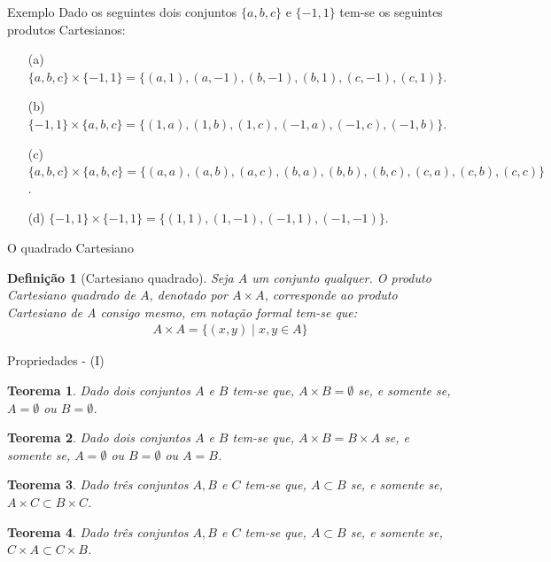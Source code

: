 \documentclass[aspectratio=169]{beamer}
\newtheorem{defi}{Definição}
\newtheorem{teo}{Teorema}
\begin{document}
	\begin{frame}{Exemplo}
		Dado os seguintes dois conjuntos $\{a, b, c\}$ e $\{-1, 1\}$ tem-se os seguintes produtos Cartesianos:
		\begin{itemize}
			\item[(a)] $\{a, b, c\} \times \{-1, 1\}  = \{(a, 1), (a, -1), (b, -1), (b, 1), (c, -1), (c, 1)\}$.
			\item[(b)] $\{-1, 1\} \times \{a, b, c\}  = \{(1, a), (1, b), (1, c), (-1, a), (-1, c), (-1, b)\}$.
			\item[(c)] $\{a, b, c\} \times \{a, b, c\}   = \{(a, a), (a, b), (a, c), (b, a), (b, b), (b, c), (c, a), (c, b), (c, c)\}$.
			\item[(d)] $\{-1, 1\} \times \{-1, 1\} = \{(1, 1), (1, -1), (-1, 1), (-1, -1)\}$.
		\end{itemize}
	\end{frame}

	\begin{frame}{O quadrado Cartesiano}
		\begin{defi}[Cartesiano quadrado]\label{def:CartesianoQuadrado}
			Seja $A$ um conjunto qualquer. O produto Cartesiano quadrado de $A$, denotado por $A \times A$, corresponde ao produto Cartesiano de A consigo mesmo, em notação formal tem-se que:
			\begin{eqnarray*}
				A \times A = \{(x, y) \mid x, y \in A\}
			\end{eqnarray*}
		\end{defi}
	\end{frame}

	\begin{frame}{Propriedades - (I)}
		\begin{teo}
			Dado dois conjuntos $A$ e $B$ tem-se que, $A \times B = \emptyset$ se, e somente se, $A = \emptyset$ ou $B = \emptyset$.
		\end{teo}
		\begin{teo}
			Dado dois conjuntos $A$ e $B$ tem-se que, $A \times B = B \times A$ se, e somente se, $A = \emptyset$ ou $B = \emptyset$ ou $A = B$.
		\end{teo}
		\begin{teo}
			Dado três conjuntos $A, B$ e $C$ tem-se que, $A \subset B$ se, e somente se, $A \times C \subset B \times C$.
		\end{teo}
		\begin{teo}
			Dado três conjuntos $A, B$ e $C$ tem-se que, $A \subset B$ se, e somente se, $C \times A \subset C \times B$.
		\end{teo}
	\end{frame}
\end{document}
